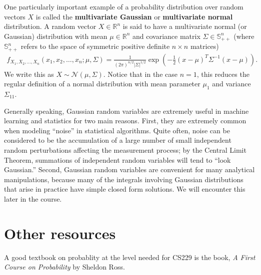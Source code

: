 \documentclass{article}
\begin{document}
One particularly important example of a probability distribution over
random vectors $X$ is called the \textbf{multivariate Gaussian} or
\textbf{multivariate normal} distribution.  A random vector $X \in
\mathbb{R}^n$ is said to have a multivariate normal (or Gaussian)
distribution with mean $\mu \in \mathbb{R}^n$ and covariance matrix
$\Sigma \in \mathbb{S}^{n}_{++}$ (where $\mathbb{S}^{n}_{++}$ refers
to the space of symmetric positive definite $n \times n$ matrices)
\begin{align*}
  f_{X_1,X_2,\ldots,X_n}(x_1,x_2,\ldots,x_n;\mu,\Sigma) = \frac{1}{(2\pi)^{n/2} |\Sigma|^{1/2}} \exp \left(-\frac{1}{2}(x - \mu)^T \Sigma^{-1} (x - \mu)\right).
\end{align*}
We write this as $X \sim \mathcal{N}(\mu,\Sigma)$.  
Notice that in the case $n=1$, this reduces the regular definition of
a normal distribution with mean parameter $\mu_1$ and variance
$\Sigma_{11}$.

Generally speaking, Gaussian random variables are extremely useful in
machine learning and statistics for two main reasons.  First, they are
extremely common when modeling ``noise'' in statistical algorithms.
Quite often, noise can be considered to be the accumulation of a large
number of small independent random perturbations affecting the
measurement process; by the Central Limit Theorem, summations of
independent random variables will tend to ``look Gaussian.''  Second,
Gaussian random variables are convenient for many analytical
manipulations, because many of the integrals involving Gaussian
distributions that arise in practice have simple closed form
solutions.  We will encounter this later in the course.

\section{Other resources}

A good textbook on probablity at the level needed for CS229 is the book,
\textit{A First Course on Probability} by Sheldon Ross.
\end{document}

